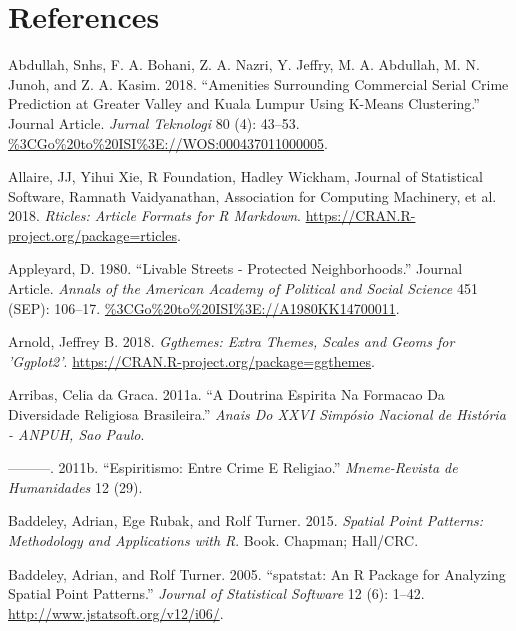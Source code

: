 \documentclass[smallextended]{svjour3}       %
\begin{document}
\hypertarget{references}{%
\section*{References}\label{references}}

\hypertarget{refs}{}
\leavevmode\hypertarget{ref-Abdullah2018amenities}{}%
Abdullah, Snhs, F. A. Bohani, Z. A. Nazri, Y. Jeffry, M. A. Abdullah, M.
N. Junoh, and Z. A. Kasim. 2018. ``Amenities Surrounding Commercial
Serial Crime Prediction at Greater Valley and Kuala Lumpur Using K-Means
Clustering.'' Journal Article. \emph{Jurnal Teknologi} 80 (4): 43--53.
\url{\%3CGo\%20to\%20ISI\%3E://WOS:000437011000005}.

\leavevmode\hypertarget{ref-Allaire2018rticles}{}%
Allaire, JJ, Yihui Xie, R Foundation, Hadley Wickham, Journal of
Statistical Software, Ramnath Vaidyanathan, Association for Computing
Machinery, et al. 2018. \emph{Rticles: Article Formats for R Markdown}.
\url{https://CRAN.R-project.org/package=rticles}.

\leavevmode\hypertarget{ref-Appleyard1980livable}{}%
Appleyard, D. 1980. ``Livable Streets - Protected Neighborhoods.''
Journal Article. \emph{Annals of the American Academy of Political and
Social Science} 451 (SEP): 106--17.
\url{\%3CGo\%20to\%20ISI\%3E://A1980KK14700011}.

\leavevmode\hypertarget{ref-Arnold2018}{}%
Arnold, Jeffrey B. 2018. \emph{Ggthemes: Extra Themes, Scales and Geoms
for 'Ggplot2'}. \url{https://CRAN.R-project.org/package=ggthemes}.

\leavevmode\hypertarget{ref-Arribas2011doutrina}{}%
Arribas, Celia da Graca. 2011a. ``A Doutrina Espirita Na Formacao Da
Diversidade Religiosa Brasileira.'' \emph{Anais Do XXVI Simpósio
Nacional de História - ANPUH, Sao Paulo}.

\leavevmode\hypertarget{ref-Arribas2011espiritismo}{}%
---------. 2011b. ``Espiritismo: Entre Crime E Religiao.''
\emph{Mneme-Revista de Humanidades} 12 (29).

\leavevmode\hypertarget{ref-Baddeley2015spatial}{}%
Baddeley, Adrian, Ege Rubak, and Rolf Turner. 2015. \emph{Spatial Point
Patterns: Methodology and Applications with R}. Book. Chapman; Hall/CRC.

\leavevmode\hypertarget{ref-Baddeley2005spatstat}{}%
Baddeley, Adrian, and Rolf Turner. 2005. ``spatstat: An R Package for
Analyzing Spatial Point Patterns.'' \emph{Journal of Statistical
Software} 12 (6): 1--42. \url{http://www.jstatsoft.org/v12/i06/}.
\end{document}
